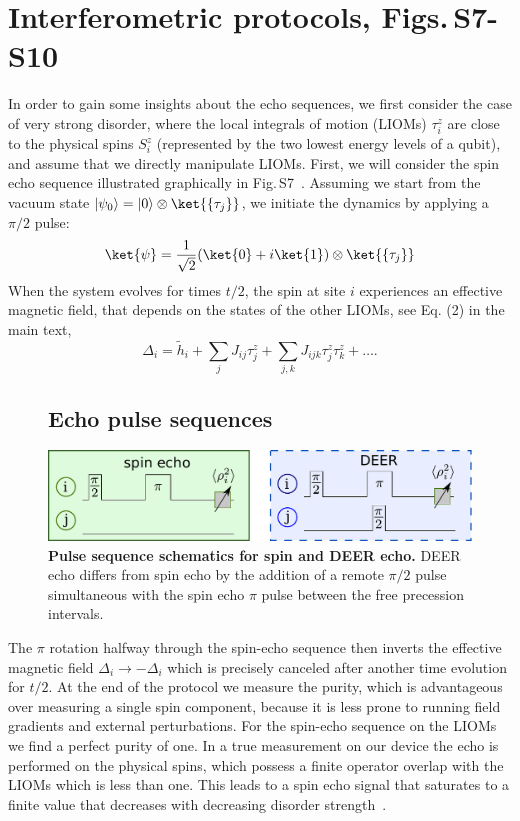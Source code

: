 \section{Interferometric protocols, Figs.\,S7-S10}
In order to gain some insights about the echo sequences, we first consider the case of very strong disorder, where the local integrals of motion (LIOMs) $\tau_i^z$ are close to the physical spins $S_i^z$ (represented by the two lowest energy levels of a qubit), and assume that we directly manipulate LIOMs. First, we will consider the spin echo sequence illustrated graphically in Fig.\,S7~\cite{KnapPRL2014}.  Assuming we start from the vacuum state $\left|\psi_0\right> = \left| 0 \right>\otimes \ket{\{\tau_j\}} $, we initiate the dynamics by applying a $\pi/2$ pulse:
\begin{equation}
\ket{\psi} =\frac{1}{\sqrt{2}} (\ket{0} + i \ket{1}) \otimes \ket{\{\tau_j\}}
\end{equation}
When the system evolves for times $t/2$, the spin at site $i$ experiences an effective magnetic field, that depends on the states of the other LIOMs, see Eq. (2) in the main text,
\begin{equation}
\label{field}
\Delta_i = \tilde{h}_i  + \sum_j J_{ij} \tau_j^z + \sum_{j,k} J_{ijk}  \tau_j^z \tau_k^z + \ldots.
\end{equation}
\begin{figure}[h]
\subsection{Echo pulse sequences}
\centering
\includegraphics[width=.6\columnwidth]{./PDF/schem2}
\caption{\textbf{Pulse sequence schematics for spin and DEER echo.}  DEER echo differs from spin echo by the addition of a remote $\pi / 2$ pulse simultaneous with the spin echo $\pi$ pulse between the free precession intervals.}
\label{fig:4}
\end{figure}
The $\pi$ rotation halfway through the spin-echo sequence then inverts the effective magnetic field $\Delta_i \to -\Delta_i$ which is precisely canceled after another time evolution for $t/2$. At the end of the protocol we measure the purity, which is advantageous over measuring a single spin component, because it is less prone to running field gradients and external perturbations. For the spin-echo sequence on the LIOMs we find a perfect purity of one.
In a true measurement on our device the echo is performed on the physical spins, which possess a finite operator overlap with the LIOMs which is less than one. This leads to a spin echo signal that saturates to a finite value that decreases with decreasing disorder strength~\cite{KnapPRL2014}.

